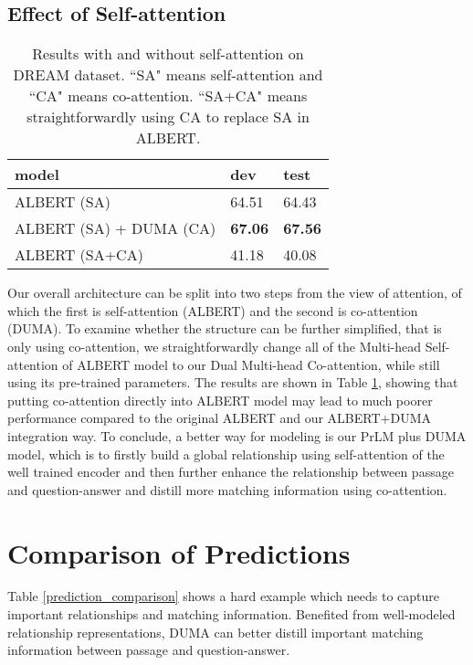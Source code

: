 \documentclass[letterpaper]{article} \usepackage{aaai21}  \usepackage{times}  \usepackage{helvet} \usepackage{courier}  \usepackage[hyphens]{url}  \usepackage{graphicx} \urlstyle{rm} \def\UrlFont{\rm}  \usepackage{natbib}  \usepackage{caption} \frenchspacing  \setlength{\pdfpagewidth}{8.5in}  \setlength{\pdfpageheight}{11in}
\begin{document}
\subsection{Effect of Self-attention}
\begin{table}[t]\small
\renewcommand\arraystretch{1.1}
	\centering
	{
		\begin{tabular}{l|l|l}
			\hline		
			 model & dev & test  \\
			\hline
			\hline
			ALBERT (SA) & 64.51 & 64.43 \\
			ALBERT (SA) + DUMA (CA) & \textbf{67.06} & \textbf{67.56} \\
			ALBERT (SA+CA) & 41.18  &  40.08 \\
			\hline
		\end{tabular}
		
	}
	\caption{\label{only_co_attention} Results with and without self-attention on DREAM dataset. ``SA" means self-attention and ``CA" means co-attention. ``SA+CA" means straightforwardly using CA to replace SA in ALBERT.}
\end{table}
Our overall architecture can be split into two steps from the view of attention, of which the first is self-attention (ALBERT) and the second is co-attention (DUMA). To examine whether the structure can be further simplified, that is only using co-attention, we straightforwardly change all of the Multi-head Self-attention of ALBERT model to our Dual Multi-head Co-attention, while still using its pre-trained parameters. The results are shown in Table \ref{only_co_attention}, showing that putting co-attention directly into ALBERT model may lead to much poorer performance compared to the original ALBERT and our ALBERT+DUMA integration way. To conclude, a better way for modeling is our PrLM plus DUMA model, which is to firstly build a global relationship using self-attention of the well trained encoder and then further enhance the relationship between passage and question-answer and distill more matching information using co-attention.
\section{Comparison of Predictions}

Table \ref{prediction_comparison} shows a hard example which needs to capture important relationships and matching information. Benefited from well-modeled relationship representations, DUMA can better distill important matching information between passage and question-answer.
\end{document}
